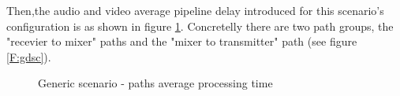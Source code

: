 Then,the audio and video average pipeline delay introduced for this scenario's configuration is as shown in figure \ref{F:gsavgpt}. Concretelly there are two path groups, the "recevier to mixer" paths and the "mixer to transmitter" path (see figure \ref{F:gdsc}).

\begin{figure}[!htb]
  \begin{center}
    \begin{subfigmatrix}{2}
    \end{subfigmatrix}
    \caption{Generic scenario - paths average processing time}
    \label{F:gsavgpt}
  \end{center}
\end{figure}

